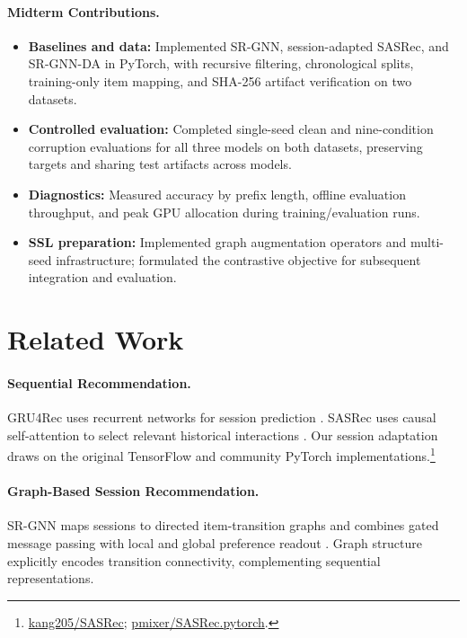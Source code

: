 \documentclass[11pt]{article}
\begin{document}
\paragraph{Midterm Contributions.}
\begin{itemize}[leftmargin=*]
  \item \textbf{Baselines and data:} Implemented SR-GNN, session-adapted SASRec, and SR-GNN-DA in PyTorch, with recursive filtering, chronological splits, training-only item mapping, and SHA-256 artifact verification on two datasets.
  \item \textbf{Controlled evaluation:} Completed single-seed clean and nine-condition corruption evaluations for all three models on both datasets, preserving targets and sharing test artifacts across models.
  \item \textbf{Diagnostics:} Measured accuracy by prefix length, offline evaluation throughput, and peak GPU allocation during training/evaluation runs.
  \item \textbf{SSL preparation:} Implemented graph augmentation operators and multi-seed infrastructure; formulated the contrastive objective for subsequent integration and evaluation.
\end{itemize}

\section{Related Work}\label{sec:related}

\paragraph{Sequential Recommendation.} GRU4Rec uses recurrent networks for session prediction \citep{hidasi2015session}. SASRec uses causal self-attention to select relevant historical interactions \citep{kang2018self}. Our session adaptation draws on the original TensorFlow and community PyTorch implementations.\footnote{\href{https://github.com/kang205/SASRec}{kang205/SASRec}; \href{https://github.com/pmixer/SASRec.pytorch}{pmixer/SASRec.pytorch}.}

\paragraph{Graph-Based Session Recommendation.} SR-GNN maps sessions to directed item-transition graphs and combines gated message passing with local and global preference readout \citep{wu2019session}. Graph structure explicitly encodes transition connectivity, complementing sequential representations.
\end{document}
